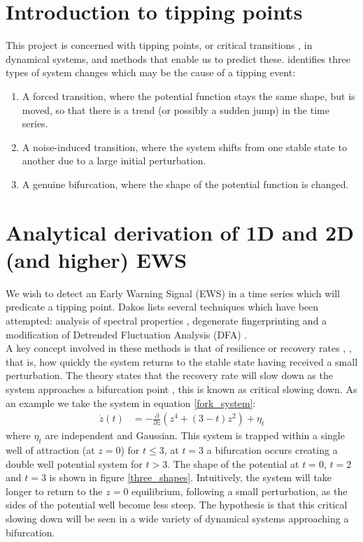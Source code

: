 \documentclass[11pt,a4paper,reqno]{article}
\numberwithin{equation}{section}
\begin{document}
\section{Introduction to tipping points}
\label{sec_tippingpoints}

This project is concerned with tipping points, or critical transitions \cite{scheffer2009}, in dynamical systems, and methods that enable us to predict these. \cite{livina2011} identifies three types of system changes which may be the cause of a tipping event:
\begin{enumerate}
\item A forced transition, where the potential function stays the same shape, but is moved, so that there is a trend (or possibly a sudden jump) in the time series.
\item A noise-induced transition, where the system shifts from one stable state to another due to a large initial perturbation.
\item A genuine bifurcation, where the shape of the potential function is changed. 
\end{enumerate}




\section{Analytical derivation of 1D and 2D (and higher) EWS}
\label{sec_EWS_methods}

We wish to detect an Early Warning Signal (EWS) in a time series which will predicate a tipping point. Dakos \cite{dakos2008} lists several techniques which have been attempted: analysis of spectral properties \cite{kleinen2003}, degenerate fingerprinting \cite{held2004} and a modification of Detrended Fluctuation Analysis (DFA) \cite{livina2007}.\\

A key concept involved in these methods is that of resilience or recovery rates \cite{scheffer2001}, \cite{dakos2012}, that is, how quickly the system returns to the stable state having received a small perturbation. The theory states that the recovery rate will slow down as the system approaches a bifurcation point \cite{scheffer2009}, this is known as critical slowing down. As an example we take the system in equation \ref{fork_system}:
\begin{align}
\dot{z}(t) & = -\frac{\partial}{\partial z}(z^4 + \left(3-t\right)z^2) + \eta_t
\label{fork_system}
\end{align}
where $\eta_t$ are independent and Gaussian. This system is trapped within a single well of attraction (at $z=0$) for $t\leq 3$, at $t=3$ a bifurcation occurs creating a double well potential system for $t>3$. The shape of the potential at $t=0$, $t=2$ and $t=3$ is shown in figure \ref{three_shapes}. Intuitively, the system will take longer to return to the $z=0$ equilibrium, following a small perturbation, as the sides of the potential well become less steep. The hypothesis is that this critical slowing down will be seen in a wide variety of dynamical systems approaching a bifurcation.\\
\end{document}
